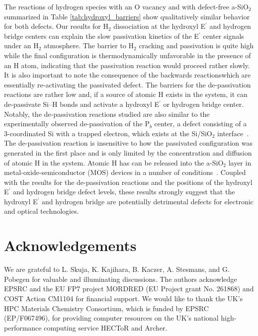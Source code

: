 \documentclass[aps,prb,reprint,superscriptaddress,showpacs]{revtex4-1}
\providecommand{\DIFadd}[1]{{\protect\color{blue}\uwave{#1}}} %
\providecommand{\DIFaddbegin}{} %
\providecommand{\DIFaddend}{} %
\begin{document}
The reactions of hydrogen species with an O vacancy and with defect-free a-SiO$_2$ summarized in Table \ref{tab:hydroxyl_barriers} show qualitatively similar behavior for both defects. Our results for H$_2$ dissociation at the hydroxyl E$^\prime$ and hydrogen bridge centers can explain the slow passivation kinetics of the E$^\prime$ center signals under an H$_2$ atmosphere. The barrier to H$_2$ cracking and passivation is quite high while the final configuration is thermodynamically unfavorable in the presence of an H atom, indicating that the passivation reaction would proceed rather slowly. It is also important to note the consequence of the backwards reactions\DIFaddbegin \DIFadd{, }\DIFaddend which are essentially re-activating the passivated defect. The barriers for the de-passivation reactions are rather low and, if a source of atomic H exists in the system, it can de-passivate \mbox{Si--H} bonds and activate a hydroxyl E$^\prime$ or hydrogen bridge center. Notably, the de-passivation reactions studied are also similar to the experimentally observed de-passivation of the P$_b$ center, a defect consisting of a 3-coordinated Si with a trapped electron, which exists at the Si/SiO$_2$ interface~\cite{cartier_depassivation}. The de-passivation reaction is insensitive to how the passivated configuration was generated in the first place and is only limited by the concentration and diffusion of atomic H in the system. Atomic H has can be released into the a-SiO$_2$ layer in metal-oxide-semiconductor (MOS) devices in a number of conditions~\cite{h_gate1,h_gate2,poindexter_hydrogenous}. Coupled with the results for the de-passivation reactions and the positions of the hydroxyl E$^\prime$ and hydrogen bridge defect levels, these results strongly suggest that the hydroxyl E$^\prime$ and hydrogen bridge are potentially detrimental defects for electronic and optical technologies.

\section{Acknowledgements}
We are grateful to L. Skuja, K. Kajihara, B. Kaczer, A. Stesmans, and G. Pobegen for valuable and illuminating discussions. The authors acknowledge EPSRC and the EU FP7 project MORDRED (EU Project grant No. 261868) and COST Action CM1104 for financial support. We would like to thank the UK's HPC Materials Chemistry Consortium, which is funded by EPSRC (EP/F067496), for providing computer resources on the UK's national high-performance computing service HECToR and Archer. 


\end{document}
